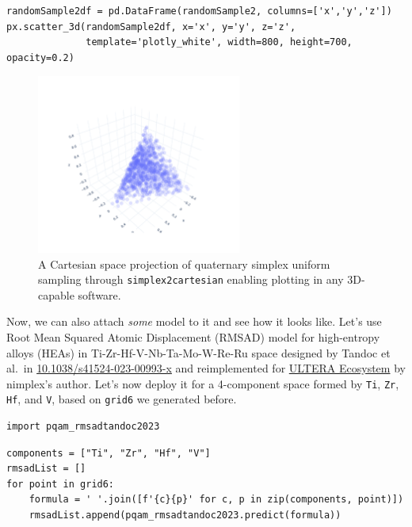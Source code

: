 \begin{verbatim}
randomSample2df = pd.DataFrame(randomSample2, columns=['x','y','z'])
px.scatter_3d(randomSample2df, x='x', y='y', z='z', 
              template='plotly_white', width=800, height=700, opacity=0.2)
\end{verbatim}

\begin{figure}[H]
    \centering
    \includegraphics[width=0.6\textwidth]{nimplexTutorial1/01.QuickStart_33_0.pdf}
    \caption{A Cartesian space projection of quaternary simplex uniform sampling through \texttt{simplex2cartesian} enabling plotting in any 3D-capable software.}
    \label{nimplextutorial1:fig:quaternarysamlingprojected}
\end{figure}

Now, we can also attach \emph{some} model to it and see how it looks
like. Let's use Root Mean Squared Atomic Displacement (RMSAD) model for
high-entropy alloys (HEAs) in Ti-Zr-Hf-V-Nb-Ta-Mo-W-Re-Ru space designed
by Tandoc et al.~in
\href{https://doi.org/10.1038/s41524-023-00993-x}{10.1038/s41524-023-00993-x}
and reimplemented for \href{https://ultera.org}{ULTERA Ecosystem} by
nimplex's author. Let's now deploy it for a 4-component space formed by
\texttt{Ti}, \texttt{Zr},
\texttt{Hf}, and \texttt{V}, based on
\texttt{grid6} we generated before.

\begin{verbatim}
import pqam_rmsadtandoc2023
\end{verbatim}

\begin{verbatim}
components = ["Ti", "Zr", "Hf", "V"]
rmsadList = []
for point in grid6:
    formula = ' '.join([f'{c}{p}' for c, p in zip(components, point)])
    rmsadList.append(pqam_rmsadtandoc2023.predict(formula))
\end{verbatim}

